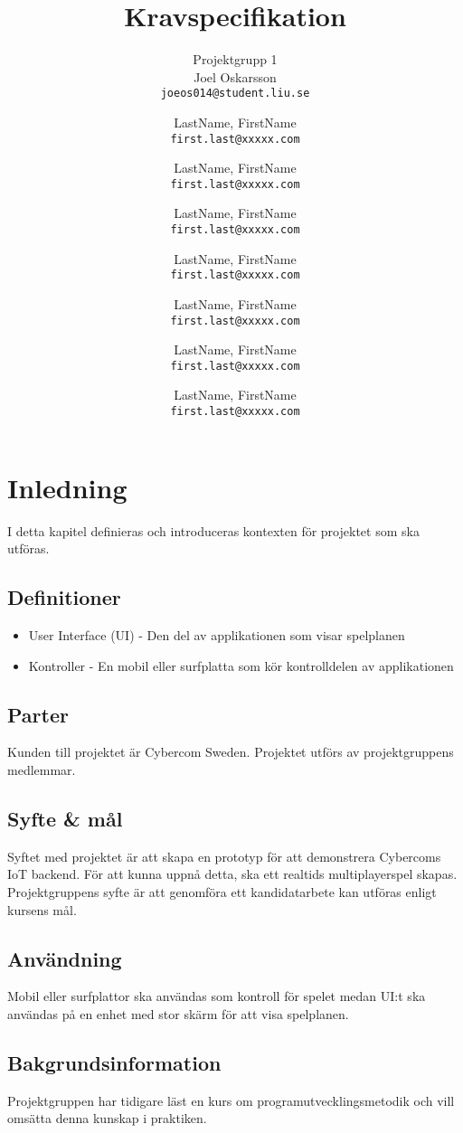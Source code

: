 \documentclass[10pt]{article}
\title{Kravspecifikation}
\author{
	Projektgrupp 1\\
	Joel Oskarsson\\
	\texttt{joeos014@student.liu.se}
	\and
	LastName, FirstName\\
	\texttt{first.last@xxxxx.com}
	\and
	LastName, FirstName\\
	\texttt{first.last@xxxxx.com}
	\and
	LastName, FirstName\\
	\texttt{first.last@xxxxx.com}
	\and
	LastName, FirstName\\
	\texttt{first.last@xxxxx.com}
  	\and
  	LastName, FirstName\\
  	\texttt{first.last@xxxxx.com}
  	\and
  	LastName, FirstName\\
  	\texttt{first.last@xxxxx.com}
  	\and
  	LastName, FirstName\\
  	\texttt{first.last@xxxxx.com}
}
\begin{document}
\maketitle

\tableofcontents

\section{Inledning}
	I detta kapitel definieras och introduceras kontexten för projektet som ska utföras.

	\subsection{Definitioner}
		\begin{itemize}
		\item User Interface (UI) - Den del av applikationen som visar spelplanen
		\item Kontroller - En mobil eller surfplatta som kör kontrolldelen av applikationen
		\end{itemize}	

	\subsection{Parter}
	Kunden till projektet är Cybercom Sweden. Projektet utförs av projektgruppens medlemmar.
	\subsection{Syfte \& mål}
		Syftet med projektet är att skapa en prototyp för att demonstrera Cybercoms IoT backend. För att kunna uppnå detta, ska ett realtids multiplayerspel skapas. Projektgruppens syfte är att genomföra ett kandidatarbete kan utföras enligt kursens mål.
	
	\subsection{Användning}
		Mobil eller surfplattor ska användas som kontroll för spelet medan UI:t ska användas på en enhet med stor skärm för att visa spelplanen.
	
	\subsection{Bakgrundsinformation}
		Projektgruppen har tidigare läst en kurs om programutvecklingsmetodik och vill omsätta denna kunskap i praktiken. 
	
\end{document}
